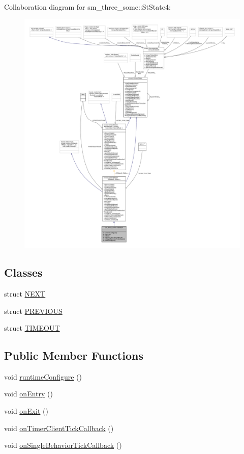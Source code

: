 Collaboration diagram for sm\+\_\+three\+\_\+some\+:\+:St\+State4\+:
\nopagebreak
\begin{figure}[H]
\begin{center}
\leavevmode
\includegraphics[width=350pt]{structsm__three__some_1_1StState4__coll__graph}
\end{center}
\end{figure}
\subsection*{Classes}
\begin{DoxyCompactItemize}
\item 
struct \hyperlink{structsm__three__some_1_1StState4_1_1NEXT}{N\+E\+XT}
\item 
struct \hyperlink{structsm__three__some_1_1StState4_1_1PREVIOUS}{P\+R\+E\+V\+I\+O\+US}
\item 
struct \hyperlink{structsm__three__some_1_1StState4_1_1TIMEOUT}{T\+I\+M\+E\+O\+UT}
\end{DoxyCompactItemize}
\subsection*{Public Member Functions}
\begin{DoxyCompactItemize}
\item 
void \hyperlink{structsm__three__some_1_1StState4_a44ef81afd6a1ad3144fbc39c44954439}{runtime\+Configure} ()
\item 
void \hyperlink{structsm__three__some_1_1StState4_a2140ab3ca693422132501cab77efca63}{on\+Entry} ()
\item 
void \hyperlink{structsm__three__some_1_1StState4_a3479e642b294941bb91c09d211df84e7}{on\+Exit} ()
\item 
void \hyperlink{structsm__three__some_1_1StState4_a521fa5ad6ba4d239400e039a8878d541}{on\+Timer\+Client\+Tick\+Callback} ()
\item 
void \hyperlink{structsm__three__some_1_1StState4_a6e33a5af98de65274cd8ad601bc10117}{on\+Single\+Behavior\+Tick\+Callback} ()
\end{DoxyCompactItemize}
